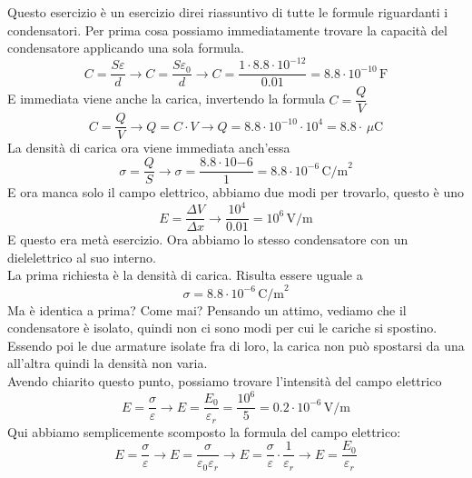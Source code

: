 Questo esercizio è un esercizio direi riassuntivo di tutte le formule riguardanti i condensatori.
Per prima cosa possiamo immediatamente trovare la capacità del condensatore applicando una sola 
formula.
\begin{equation*}
  C = \frac{S\varepsilon}{d} \rightarrow C = \frac{S\varepsilon_0}{d} \rightarrow 
  C = \frac{1\cdot8.8\cdot10^{-12}}{0.01} = \boxed{8.8\cdot10^{-10}\,\text{F}}
\end{equation*}
E immediata viene anche la carica, invertendo la formula $C = \dfrac{Q}{V}$
\begin{equation*}
  C = \frac{Q}{V} \rightarrow Q = C\cdot V \rightarrow Q = 8.8\cdot10^{-10}\cdot10^4 = 
  \boxed{8.8\cdot\,\mu\text{C}}
\end{equation*}
La densità di carica ora viene immediata anch'essa
\begin{equation*}
  \sigma = \frac{Q}{S} \rightarrow \sigma = \frac{8.8\cdot10{-6}}{1} = 
  \boxed{8.8\cdot10^{-6}\,\text{C/m}^2}
\end{equation*}
E ora manca solo il campo elettrico, abbiamo due modi per trovarlo, questo è uno
\begin{equation*}
  E = \frac{\Delta V}{\Delta x} \rightarrow \frac{10^4}{0.01} = \boxed{10^6\,\text{V/m}}
\end{equation*}
E questo era metà esercizio. Ora abbiamo lo stesso condensatore con un dielelettrico al suo interno.\\
La prima richiesta è la densità di carica. Risulta essere uguale a
\begin{equation*}
  \sigma = \boxed{8.8\cdot10^{-6}\,\text{C/m}^2}
\end{equation*}
Ma è identica a prima? Come mai? Pensando un attimo, vediamo che il condensatore è isolato, quindi non
ci sono modi per cui le cariche si spostino. Essendo poi le due armature isolate fra di loro, la
carica non può spostarsi da una all'altra quindi la densità non varia.\\
Avendo chiarito questo punto, possiamo trovare l'intensità del campo elettrico
\begin{equation*}
  E = \frac{\sigma}{\varepsilon} \rightarrow E = \frac{E_0}{\varepsilon_r} = 
  \frac{10^6}{5} = \boxed{0.2\cdot10^{-6}\,\text{V/m}}
\end{equation*}
Qui abbiamo semplicemente scomposto la formula del campo elettrico:
\begin{equation*}
  E = \frac{\sigma}{\varepsilon} \rightarrow E = \frac{\sigma}{\varepsilon_0\varepsilon_r} \rightarrow
  E = \frac{\sigma}{\varepsilon}\cdot\frac{1}{\varepsilon_r} \rightarrow E = \frac{E_0}{\varepsilon_r}
\end{equation*}
